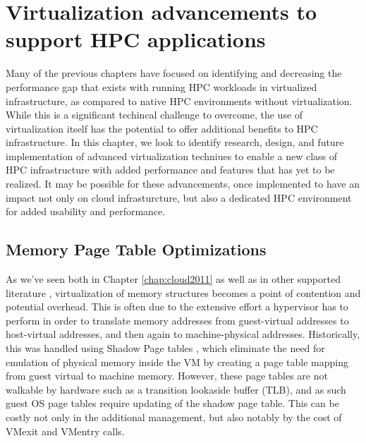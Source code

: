 
\chapter{Virtualization advancements to support HPC applications}
\label{chap:future-work}

Many of the previous chapters have focused on identifying and decreasing the performance gap that exists with running HPC workloads in virtualized infrastructure, as compared to native HPC environments without virtualization. While this is a significant techincal challenge to overcome, the use of virtualization itself has the potential to offer additional benefits to HPC infrastructure. In this chapter, we look to identify research, design, and future implementation of advanced virtualization techniues to enable a new class of HPC infrastructure with added performance and features that has yet to be realized.  It may be possible for these advancements, once implemented to have an impact not only on cloud infrasturcture, but also a dedicated HPC environment for added usability and performance. 

\section{Memory Page Table Optimizations}

As we've seen both in Chapter \ref{chap:cloud2011} as well as in other supported literature \cite{vm-memory}, virtualization of memory structures becomes a point of contention and potential overhead. This is often due to the extensive effort a hypervisor has to perform in order to translate memory addresses from guest-virtual addresses to host-virtual addresses, and then again to machine-physical addresses.  Historically, this was handled using Shadow Page tables \cite{shadow-pagetables}, which eliminate the need for emulation of physical memory inside the VM by creating a page table mapping from guest virtual to machine memory. However, these page tables are not walkable by hardware such as a transition lookaside buffer (TLB), and as such guest OS page tables require updating of the shadow page table. This can be costly not only in the additional management, but also notably by the cost of VMexit and VMentry calls.

